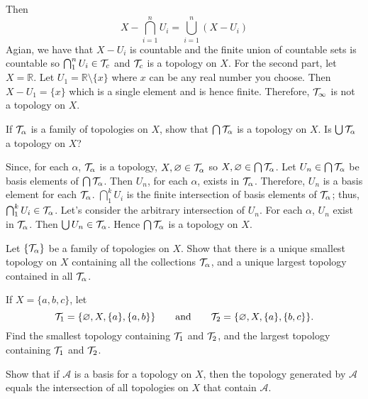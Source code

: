 \begin{exercise}
  Then
  \[
  X - \bigcap_{i = 1}^nU_i = \bigcup_{i = 1}^n(X - U_i)
  \]
  Agian, we have that \(X - U_i\) is countable and the finite union of
  countable sets is countable so \(\bigcap_1^nU_i\in\mathcal{T}_c\) and \(\mathcal{T}_c\) is
  a topology on \(X\).
  For the second part, let \(X = \mathbb{R}\).
  Let \(U_1 = \mathbb{R}\setminus\{x\}\) where \(x\) can be any real number you
  choose.
  Then \(X - U_1 = \{x\}\) which is a single element and is hence finite.
  Therefore, \(\mathcal{T}_{\infty}\) is not a topology on \(X\).
\item
  \begin{exercise}[label = (\alph*)]
  \item
    If \(\mathcal{T}_{\alpha}\) is a family of topologies on \(X\), show that
    \(\bigcap\mathcal{T}_{\alpha}\) is a topology on \(X\).
    Is \(\bigcup\mathcal{T}_{\alpha}\) a topology on \(X\)?
    \par\smallskip
    Since, for each \(\alpha\), \(\mathcal{T}_{\alpha}\) is a topology,
    \(X,\varnothing\in\mathcal{T}_{\alpha}\) so
    \(X,\varnothing\in\bigcap\mathcal{T}_{\alpha}\).
    Let \(U_n\in\bigcap\mathcal{T}_{\alpha}\) be basis elements of
    \(\bigcap\mathcal{T}_{\alpha}\).
    Then \(U_n\), for each \(\alpha\), exists in \(\mathcal{T}_{\alpha}\).
    Therefore, \(U_n\) is a basis element for each \(\mathcal{T}_{\alpha}\).
    \(\bigcap_1^kU_i\) is the finite intersection of basis elements of
    \(\mathcal{T}_{\alpha}\); thus, \(\bigcap_1^kU_i\in\mathcal{T}_{\alpha}\).
    Let's consider the arbitrary intersection of \(U_n\).
    For each \(\alpha\), \(U_n\) exist in \(\mathcal{T}_{\alpha}\).
    Then \(\bigcup U_n\in\mathcal{T}_{\alpha}\).
    Hence \(\bigcap\mathcal{T}_{\alpha}\) is a topology on \(X\).
  \item
    Let \(\{\mathcal{T}_{\alpha}\}\) be a family of topologies on \(X\).
    Show that there is a unique smallest topology on \(X\) containing all the
    collections \(\mathcal{T}_{\alpha}\), and a unique largest topology
    contained in all \(\mathcal{T}_{\alpha}\).
  \item
    If \(X = \{a,b,c\}\), let
    \[
    \mathcal{T}_1 = \{\varnothing, X, \{a\}, \{a, b\}\}\qquad\text{and}\qquad
    \mathcal{T}_2 = \{\varnothing, X, \{a\}, \{b, c\}\}.
    \]
    Find the smallest topology containing \(\mathcal{T}_1\) and \(\mathcal{T}_2\), and the
    largest topology containing \(\mathcal{T}_1\) and \(\mathcal{T}_2\).
  \end{exercise}
\item
  Show that if \(\mathcal{A}\) is a basis for a topology on \(X\), then the
  topology generated by \(\mathcal{A}\) equals the intersection of all
  topologies on \(X\) that contain \(\mathcal{A}\).

\end{exercise}
